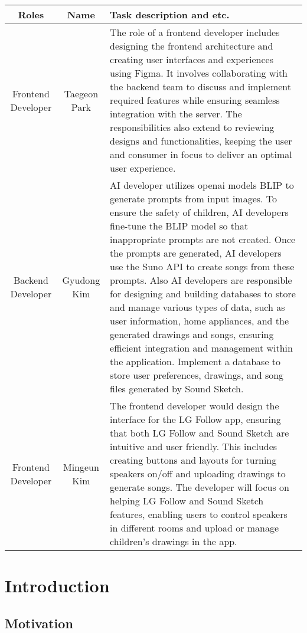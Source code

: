 \documentclass[conference]{IEEEtran}
\begin{document}
\vspace{0.8cm}

\begin{table}[h!]
\centering
\begin{tabular}{|c|c|p{3.5cm}|}
\hline
\textbf{Roles} & \textbf{Name} & \textbf{Task description and etc.} \\
\hline
Frontend Developer & Taegeon Park & The role of a frontend developer includes designing the frontend architecture and creating user interfaces and experiences using Figma. It involves collaborating with the backend team to discuss and implement required features while ensuring seamless integration with the server. The responsibilities also extend to reviewing designs and functionalities, keeping the user and consumer in focus to deliver an optimal user experience. \\
\hline
Backend Developer & Gyudong Kim & AI developer utilizes openai models BLIP to generate prompts from input images. To ensure the safety of children, AI developers fine-tune the BLIP model so that inappropriate prompts are not created. Once the prompts are generated, AI developers use the Suno API to create songs from these prompts. Also AI developers are responsible for designing and building databases to store and manage various types of data, such as user information, home appliances, and the generated drawings and songs, ensuring efficient integration and management within the application. Implement a database to store user preferences, drawings, and song files generated by Sound Sketch.\\
\hline
Frontend Developer & Mingeun Kim & The frontend developer would design the interface for the LG Follow app, ensuring that both LG Follow and Sound Sketch are intuitive and user friendly. This includes creating buttons and layouts for turning speakers on/off and uploading drawings to generate songs. The developer will focus on helping LG Follow and Sound Sketch features, enabling users to control speakers in different rooms and upload or manage children's drawings in the app.  \\
\hline
\end{tabular}
\end{table}


\IEEEpeerreviewmaketitle

\section{Introduction}

\subsection{Motivation}
\end{document}
